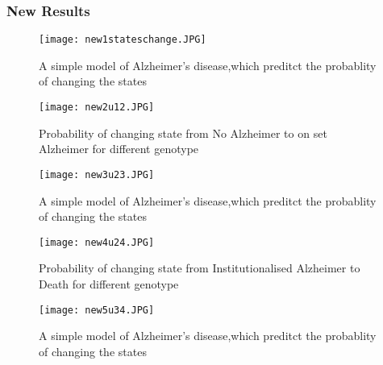 \documentclass{article}
\begin{document}
\begin{itemize}
\subsubsection{New Results}
\begin{figure}[htp]
    \centering
    \texttt{[image: new1stateschange.JPG]}
    \caption{A simple model of Alzheimer's disease,which preditct the probablity of changing the states}
    \label{fig:Plot}
\end{figure}
\begin{figure}[htp]
    \centering
    \texttt{[image: new2u12.JPG]}
    \caption{Probability of changing state from No Alzheimer to on set Alzheimer for different genotype}
    \label{fig:Plot}
\end{figure}
\begin{figure}[htp]
    \centering
    \texttt{[image: new3u23.JPG]}
    \caption{A simple model of Alzheimer's disease,which preditct the probablity of changing the states}
    \label{fig:Plot}
\end{figure}
\begin{figure}[htp]
    \centering
    \texttt{[image: new4u24.JPG]}
    \caption{Probability of changing state from Institutionalised Alzheimer to Death for different genotype}
    \label{fig:Plot}
\end{figure}
\begin{figure}[htp]
    \centering
    \texttt{[image: new5u34.JPG]}
    \caption{A simple model of Alzheimer's disease,which preditct the probablity of changing the states}
    \label{fig:Plot}
\end{figure}
\end{itemize}

\newpage
\end{document}
